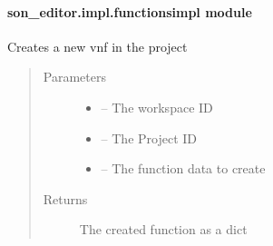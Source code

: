 \documentclass[letterpaper,10pt,english]{sphinxmanual}
\begin{document}
\paragraph{son\_editor.impl.functionsimpl module}
\label{_source/son_editor.impl:module-son_editor.impl.functionsimpl}\label{_source/son_editor.impl:son-editor-impl-functionsimpl-module}

\begin{fulllineitems}
\label{_source/son_editor.impl:son_editor.impl.functionsimpl.create_function}
Creates a new vnf in the project
\begin{quote}\begin{description}
\item[{Parameters}] \leavevmode\begin{itemize}
\item {} 
 -- The workspace ID

\item {} 
 -- The Project ID

\item {} 
 -- The function data to create

\end{itemize}

\item[{Returns}] \leavevmode
The created function as a dict

\end{description}\end{quote}

\end{fulllineitems}

\end{document}
